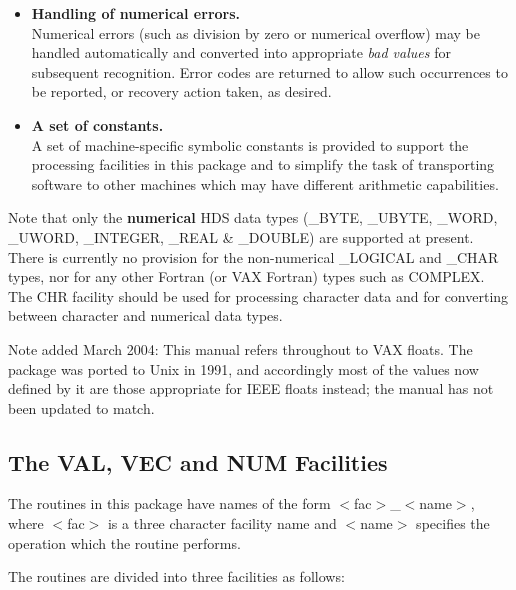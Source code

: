 \documentclass[11pt,nolof]{starlink}
\providecommand{\name}[1]{\mbox{#1}}
\begin{document}
\begin{itemize}
\item \textbf{Handling of numerical errors.}\\
Numerical errors (such as division by zero or numerical overflow) may be
handled automatically and converted into appropriate \emph{bad values} for
subsequent recognition.
Error codes are returned to allow such occurrences to be reported, or
recovery action taken, as desired.

\item \textbf{A set of constants.}\\
A set of machine-specific symbolic constants is provided to support the
processing facilities in this package and to simplify the task of
transporting software to other machines which may have different arithmetic
capabilities.

\end{itemize}

Note that only the \textbf{numerical} \name{HDS} data types (\name{\_BYTE},
\name{\_UBYTE}, \name{\_WORD}, \name{\_UWORD}, \name{\_INTEGER},
\name{\_REAL} \& \name{\_DOUBLE}) are supported at present.
There is currently no provision for the non-numerical \name{\_LOGICAL} and
\name{\_CHAR} types, nor for any other Fortran (or \name{VAX} Fortran) types
such as \name{COMPLEX}.
The \name{CHR} facility should be used for processing character data and for
converting between character and numerical data types.

Note added March 2004: This manual refers throughout to VAX floats.
The package was ported to Unix in 1991, and accordingly most of the
values now defined by it are those appropriate for IEEE floats
instead; the manual has not been updated to match.

\subsection{The \name{VAL}, \name{VEC} and \name{NUM} Facilities}

The routines in this package have names of the form
\mbox{$<$fac$>$\_$<$name$>$}, where \mbox{$<$fac$>$} is a three character
facility name and \mbox{$<$name$>$} specifies the operation which the
routine performs.

The routines are divided into three facilities as follows:
\end{document}
